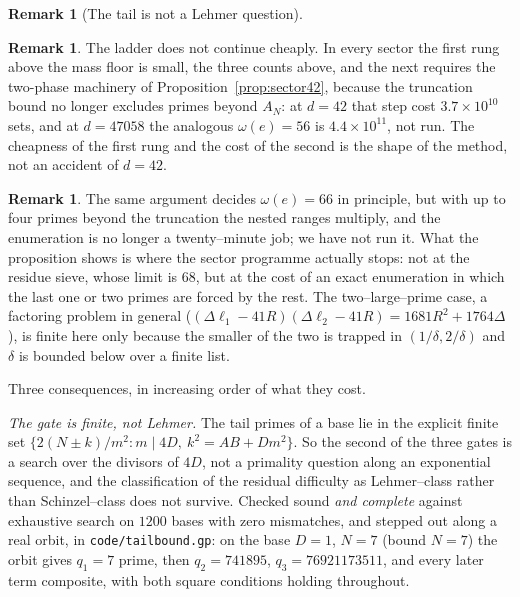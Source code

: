 \documentclass[11pt]{article}
\theoremstyle{definition}
\newtheorem{remark}[theorem]{Remark}
\begin{document}
\begin{remark}[The tail is not a Lehmer question]
\begin{remark}
The ladder does not continue cheaply. In every sector the first rung above the mass floor is small, the three counts above, and the next requires the two-phase machinery of
Proposition~\ref{prop:sector42}, because the truncation bound no longer excludes primes beyond
$A_N$: at $d=42$ that step cost $3.7\times10^{10}$ sets, and at $d=47058$ the analogous
$\omega(e)=56$ is $4.4\times10^{11}$, not run. The cheapness of the first rung and the cost of the
second is the shape of the method, not an accident of $d=42$.
\end{remark}

\begin{remark}
The same argument decides $\omega(e)=66$ in principle, but with up to four primes beyond the
truncation the nested ranges multiply, and the enumeration is no longer a twenty--minute job; we
have not run it. What the proposition shows is where the sector programme actually stops: not at
the residue sieve, whose limit is $68$, but at the cost of an exact enumeration in which the last
one or two primes are forced by the rest. The two--large--prime case, a factoring problem in general
($(\Delta\ell_1-41R)(\Delta\ell_2-41R)=1681R^2+1764\Delta$), is finite here only because the smaller
of the two is trapped in $(1/\delta,2/\delta)$ and $\delta$ is bounded below over a finite list.
\end{remark}

Three consequences, in increasing order of what they cost.

\emph{The gate is finite, not Lehmer.} The tail primes of a base lie in the explicit finite set
$\{2(N\pm k)/m^2: m\mid 4D,\ k^2=AB+Dm^2\}$. So the second of the three gates is a search over the
divisors of $4D$, not a primality question along an exponential sequence, and the classification of
the residual difficulty as Lehmer--class rather than Schinzel--class does not survive. Checked sound
\emph{and complete} against exhaustive search on $1200$ bases with zero mismatches, and stepped out
along a real orbit, in \texttt{code/tailbound.gp}: on the base $D=1$, $N=7$ (bound $N=7$) the orbit
gives $q_1=7$ prime, then $q_2=741895$, $q_3=76921173511$, and every later term composite, with both
square conditions holding throughout.


\end{remark}
\end{document}
